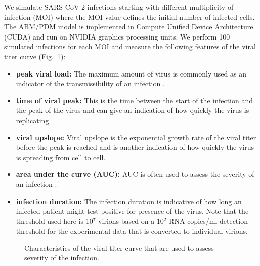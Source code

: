 We simulate SARS-CoV-2 infections starting with different multiplicity of infection (MOI) where the MOI value defines the initial number of infected cells. The ABM/PDM model is implemented in Compute Unified Device Architecture (CUDA) and run on NVIDIA graphics processing units. We perform 100 simulated infections for each MOI and measure the following features of the viral titer curve (Fig.\ \ref{measurements}): 
\begin{itemize}
\item \textbf{peak viral load:} The maximum amount of virus is commonly used as an indicator of the transmissibility of an infection \citep{handel09}. 
\item \textbf{time of viral peak:} This is the time between the start of the infection and the peak of the virus and can give an indication of how quickly the virus is replicating.
\item \textbf{viral upslope:} Viral upslope is the exponential growth rate of the viral titer before the peak is reached and is another indication of how quickly the virus is spreading from cell to cell. 
\item \textbf{area under the curve (AUC):} AUC is often used to assess the severity of an infection \citep{hayden00, barroso05}.
\item \textbf{infection duration:} The infection duration is indicative of how long an infected patient might test positive for presence of the virus. Note that the threshold used here is 10$^7$ virions based on a 10$^2$ RNA copies/ml detection threshold for the experimental data \citep{goncalves20} that is converted to individual virions.
\end{itemize}
\begin{figure}[!h]

\begin{center}
\caption{Characteristics of the viral titer curve that are used to assess severity of the infection.\label{measurements}}
\end{center}
\end{figure} 



